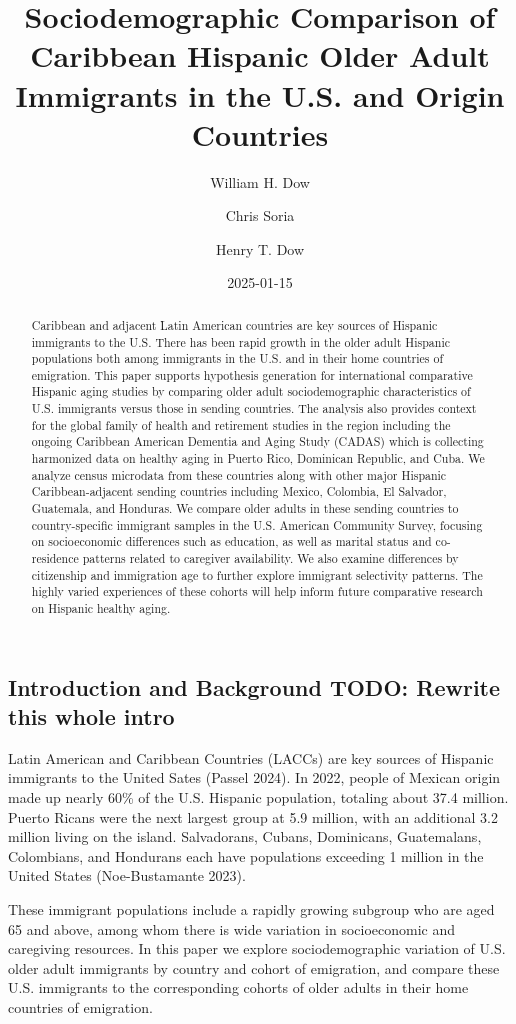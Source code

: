 \documentclass[
]{article}
\title{Sociodemographic Comparison of Caribbean Hispanic Older Adult
Immigrants in the U.S. and Origin Countries}
\author{William H. Dow \and Chris Soria \and Henry T. Dow}
\date{2025-01-15}
\begin{document}
\maketitle
\begin{abstract}
Caribbean and adjacent Latin American countries are key sources of
Hispanic immigrants to the U.S. There has been rapid growth in the older
adult Hispanic populations both among immigrants in the U.S. and in
their home countries of emigration. This paper supports hypothesis
generation for international comparative Hispanic aging studies by
comparing older adult sociodemographic characteristics of U.S.
immigrants versus those in sending countries. The analysis also provides
context for the global family of health and retirement studies in the
region including the ongoing Caribbean American Dementia and Aging Study
(CADAS) which is collecting harmonized data on healthy aging in Puerto
Rico, Dominican Republic, and Cuba. We analyze census microdata from
these countries along with other major Hispanic Caribbean-adjacent
sending countries including Mexico, Colombia, El Salvador, Guatemala,
and Honduras. We compare older adults in these sending countries to
country-specific immigrant samples in the U.S. American Community
Survey, focusing on socioeconomic differences such as education, as well
as marital status and co-residence patterns related to caregiver
availability. We also examine differences by citizenship and immigration
age to further explore immigrant selectivity patterns. The highly varied
experiences of these cohorts will help inform future comparative
research on Hispanic healthy aging.
\end{abstract}


\subsection{Introduction and Background TODO: Rewrite this whole
intro}\label{sec-intro}

Latin American and Caribbean Countries (LACCs) are key sources of
Hispanic immigrants to the United Sates (Passel 2024). In 2022, people
of Mexican origin made up nearly 60\% of the U.S. Hispanic population,
totaling about 37.4 million. Puerto Ricans were the next largest group
at 5.9 million, with an additional 3.2 million living on the island.
Salvadorans, Cubans, Dominicans, Guatemalans, Colombians, and Hondurans
each have populations exceeding 1 million in the United States
(Noe-Bustamante 2023).

These immigrant populations include a rapidly growing subgroup who are
aged 65 and above, among whom there is wide variation in socioeconomic
and caregiving resources. In this paper we explore sociodemographic
variation of U.S. older adult immigrants by country and cohort of
emigration, and compare these U.S. immigrants to the corresponding
cohorts of older adults in their home countries of emigration.
\end{document}

